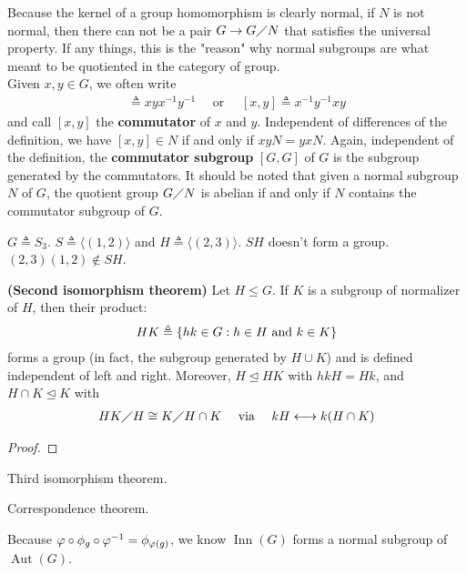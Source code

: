 \documentclass{report}
\begin{document}
Because the kernel of a group homomorphism is clearly normal, if $N$ is not normal, then there can not be a pair $G\rightarrow G\diagup N$ that satisfies the universal property.  If any things, this is the "reason" why normal subgroups are what meant to be quotiented in the category of group.  \\

Given $x,y \in G$, we often write  
\begin{align*}
[x,y]\triangleq xyx^{-1}y^{-1}\quad \text{ or }\quad [x,y]\triangleq x^{-1}y^{-1}xy
\end{align*}
and call $[x,y]$ the \textbf{commutator} of $x$ and  $y$. Independent of differences of the definition, we have $[x,y]\in N$ if and only if $xyN=yxN$. Again, independent of the definition, the \textbf{commutator subgroup} $[G,G]$ of $G$ is the subgroup generated by the commutators. It should be noted that given a normal subgroup $N$ of $G$, the quotient group  $G \diagup N$ is abelian if and only if $N$ contains the commutator subgroup of  $G$. 


\begin{example}
$G\triangleq S_3$. $S\triangleq  \langle (1,2)\rangle $ and $H\triangleq \langle (2,3)\rangle $. $SH$ doesn't form a group. $(2,3)(1,2)\not \in SH$. 
\end{example}
\begin{theorem}
\textbf{(Second isomorphism theorem)} Let $H\leq G$. If $K$ is a subgroup of normalizer of $H$, then their product: 
\begin{align*}
HK\triangleq  \left\{ hk \in G: h \in H\text{ and } k \in K \right\}
\end{align*}
forms a group (in fact, the subgroup generated by $H\cup K$) and is defined independent of left and right. Moreover, $H\trianglelefteq HK$ with $hkH=Hk$, and $H\cap K \trianglelefteq K$ with 
\begin{align*}
HK \diagup H \cong  K \diagup H \cap K \quad \text{ via } \quad  kH  \longleftrightarrow k (H \cap K) 
\end{align*}
\end{theorem}
\begin{proof}

\end{proof}
Third isomorphism theorem. 

Correspondence theorem.


Because $ \phi\circ \pfi _g \circ \phi^{-1} = \pfi _{\phi(g)}$, we know $\operatorname{Inn}(G)$ forms a normal subgroup of $\operatorname{Aut}(G)$. \\
\end{document}
